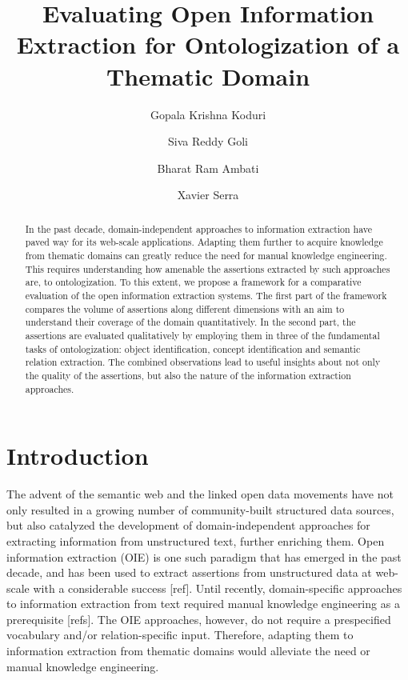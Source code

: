 \documentclass{llncs}
\begin{document}
\title{Evaluating Open Information Extraction for Ontologization of a Thematic Domain}

\author{Gopala Krishna Koduri \and Siva Reddy Goli \and Bharat Ram Ambati \and Xavier Serra}

\maketitle

\begin{abstract}
In the past decade, domain-independent approaches to information extraction have paved way for its web-scale applications. Adapting them further to acquire knowledge from thematic domains can greatly reduce the need for manual knowledge engineering. This requires understanding how amenable the assertions extracted by such approaches are, to ontologization. To this extent, we propose a framework for a comparative evaluation of the open information extraction systems. The first part of the framework compares the volume of assertions along different dimensions with an aim to understand their coverage of the domain quantitatively. In the second part, the assertions are evaluated qualitatively by employing them in three of the fundamental tasks of ontologization: object identification, concept identification and semantic relation extraction. The combined observations lead to useful insights about not only the quality of the assertions, but also the nature of the information extraction approaches.
\end{abstract}

\section{Introduction}
\label{sec:intro}
The advent of the semantic web and the linked open data movements have not only resulted in a growing number of community-built structured data sources, but also catalyzed the development of domain-independent approaches for extracting information from unstructured text, further enriching them. Open information extraction (OIE) is one such paradigm that has emerged in the past decade, and has been used to extract assertions from unstructured data at web-scale with a considerable success [ref]. Until recently, domain-specific approaches to information extraction from text required manual knowledge engineering as a prerequisite [refs]. The OIE approaches, however, do not require a prespecified vocabulary and/or relation-specific input. Therefore, adapting them to information extraction from thematic domains would alleviate the need or manual knowledge engineering.
\end{document}
